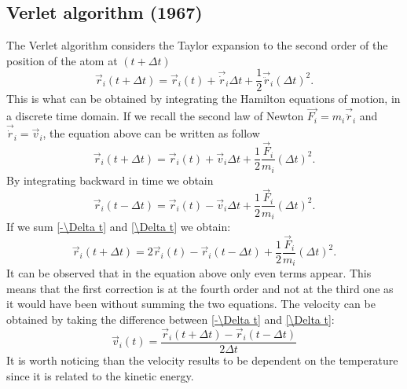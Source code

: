 \subsection{Verlet algorithm (1967)}
The Verlet algorithm considers the Taylor expansion to the second order of the position of the atom at $(t+ \Delta t)$
\begin{equation}
\vec{r}_{i} (t+ \Delta t) = \vec{r}_{i}(t) + \vec{\dot{r}}_{i} \Delta t + \frac{1}{2}\vec{\ddot{r}}_{i}(\Delta t)^{2}.
\end{equation}
This is what can be obtained by integrating the Hamilton equations of motion, in a discrete time domain.
If we recall the second law of Newton $\vec{F_{i}} = m_{i} \vec{\ddot{r}}_{i}$ and $\vec{\dot{r}}_{i}  = \vec{v}_{i}$, the equation above can be written as follow
\begin{equation} \label{\Delta t}
\vec{r}_{i} (t+ \Delta t) = \vec{r}_{i}(t) + \vec{v}_{i} \Delta t + \frac{1}{2}\frac{\vec{F}_{i}}{m_{i}}(\Delta t)^{2}.
\end{equation}
By integrating backward in time we obtain
\begin{equation} \label{-\Delta t}
\vec{r}_{i} (t- \Delta t) = \vec{r}_{i}(t) - \vec{v}_{i} \Delta t + \frac{1}{2}\frac{\vec{F}_{i}}{m_{i}}(\Delta t)^{2}.
\end{equation}
If we sum \eqref{-\Delta t} and \eqref{\Delta t} we obtain:
\begin{equation} \label{-\Delta t}
\vec{r}_{i} (t+ \Delta t) = 2\vec{r}_{i}(t) - \vec{r}_{i} (t- \Delta t)+ \frac{1}{2}\frac{\vec{F}_{i}}{m_{i}}(\Delta t)^{2}.
\end{equation}
It can be observed that in the equation above only even terms appear. This means that the first correction is at the fourth order and not at the third one as it would have been without summing the two equations. 
The velocity can be obtained by taking the difference between \eqref{-\Delta t} and \eqref{\Delta t}:
\begin{equation}
\vec{v}_{i}(t) = \frac{\vec{r}_{i} (t+\Delta t) - \vec{r}_{i} (t- \Delta t) }{2 \Delta t}
\end{equation} 
It is worth noticing than the velocity results to be dependent on the temperature since it is related to the kinetic energy.
